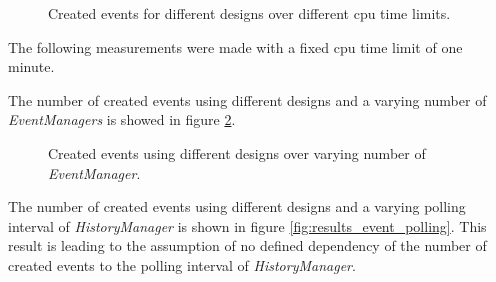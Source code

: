 \begin{figure}
    \centering
    \caption{Created events for different designs over different cpu time limits.}
    \label{fig:results_event_cpu_time}
\end{figure}

The following measurements were made with a fixed cpu time limit of one minute.

The number of created events using different designs and a varying number of \emph{EventManagers} is showed in figure \ref{fig:results_event_eventmanager}.
\\

\begin{figure}
    \centering
    \caption{Created events using different designs over varying number of \emph{EventManager}.}
    \label{fig:results_event_eventmanager}
\end{figure}

The number of created events using different designs and a varying polling interval of \emph{HistoryManager} is shown in figure \ref{fig:results_event_polling}.
This result is leading to the assumption of no defined dependency of the number of created events to the polling interval of \emph{HistoryManager}.
\\

